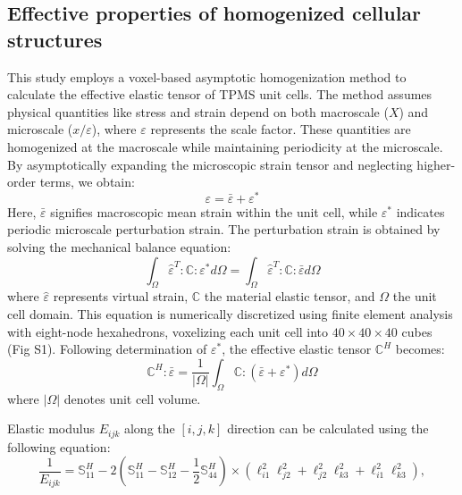 \documentclass[preprint,review,12pt,authoryear]{elsarticle}
\begin{document}
\subsection{Effective properties of homogenized cellular structures}
\label{subsec:homo}
This study employs a voxel-based asymptotic homogenization method \citep{Dong2019} to calculate the effective elastic tensor of TPMS unit cells. The method assumes physical quantities like stress and strain depend on both macroscale ($X$) and microscale ($x/\varepsilon$), where $\varepsilon$ represents the scale factor. These quantities are homogenized at the macroscale while maintaining periodicity at the microscale. By asymptotically expanding the microscopic strain tensor and neglecting higher-order terms, we obtain:
\begin{equation}
    \varepsilon = \bar{\varepsilon} + \varepsilon^{*}
\label{eq:2}
\end{equation}
Here, $\bar{\varepsilon}$ signifies macroscopic mean strain within the unit cell, while $\varepsilon^{*}$ indicates periodic microscale perturbation strain. The perturbation strain is obtained by solving the mechanical balance equation:
\begin{equation}
\int_{\Omega}\hat{\varepsilon}^T:\mathbb{C}:\varepsilon^{*}d\Omega = \int_{\Omega}\hat{\varepsilon}^T:\mathbb{C}:\bar{\varepsilon}d\Omega
\label{eq:3}
\end{equation}
where $\hat{\varepsilon}$ represents virtual strain, $\mathbb{C}$ the material elastic tensor, and $\Omega$ the unit cell domain. This equation is numerically discretized using finite element analysis with eight-node hexahedrons, voxelizing each unit cell into $40 \times 40 \times 40$ cubes (Fig S1). Following determination of $\varepsilon^{*}$, the effective elastic tensor $\mathbb{C}^H$ becomes:
\begin{equation}
\mathbb{C}^H:\bar{\varepsilon} = \frac{1}{|\Omega|}\int_{\Omega}\mathbb{C}:(\bar{\varepsilon}+\varepsilon^{*})d\Omega
    \label{eq:4}
\end{equation}
where $|\Omega|$ denotes unit cell volume.

Elastic modulus $E_{ijk}$ along the $[i,j,k]$ direction can be calculated using the following equation:
\begin{equation}
\frac{1}{E_{ijk}} = \mathbb{S}^H_{11} - 2 \left(\mathbb{S}^H_{11} - \mathbb{S}^H_{12} - \frac{1}{2} \mathbb{S}^H_{44} \right) \times \left( \ell_{i1}^2 \ell_{j2}^2 + \ell_{j2}^2 \ell_{k3}^2 + \ell_{i1}^2 \ell_{k3}^2 \right),
    \label{eq:6}
\end{equation}
\end{document}
